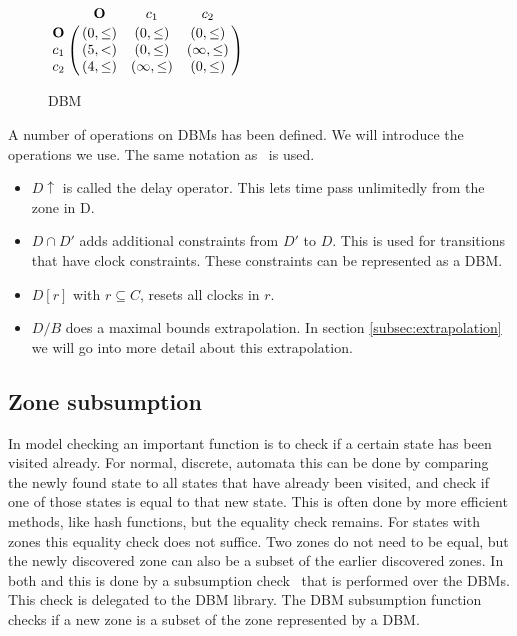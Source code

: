 \begin{figure}
	\centering
	\begin{math}
 \bordermatrix{ 		                 & \mathbf{O} & c_1           & c_2        \cr
 			\mathbf{O} &(0,\leq)      & (0,\leq)      & (0,\leq)     \cr
 			c_1        &(5,<   )      & (0,\leq)      & (\infty,\leq)\cr
 			c_2        &(4,\leq)      & (\infty,\leq) & (0,\leq)     \cr}
	\end{math}
	\caption{DBM}
	\label{fig:dbm}
\end{figure}

A number of operations on DBMs has been defined. We will introduce the operations we use. The same notation as~\cite{eemcs21972} is used.
\begin{itemize}
\item $D \uparrow$ is called the delay operator. This lets time pass unlimitedly from the zone in D.
\item $D \cap D'$ adds additional constraints from $D'$ to $D$. This is used for transitions that have clock constraints. These constraints can be represented as a DBM.
\item $D[r]$ with $r \subseteq C$, resets all clocks in $r$.
\item $D/B$ does a maximal bounds extrapolation. In section \ref{subsec:extrapolation} we will go into more detail about this extrapolation.

\end{itemize}

\subsection{Zone subsumption}
\label{subsec:subsumtion}
In model checking an important function is to check if a certain state has been visited already. For normal, discrete, automata this can be done by comparing the newly found state to all states that have already been visited, and check if one of those states is equal to that new state. This is often done by more efficient methods, like hash functions, but the equality check remains. For states with zones this equality check does not suffice. Two zones do not need to be equal, but the newly discovered zone can also be a subset of the earlier discovered zones. In both \ltsmin{} and \uppaal{} this is done by a subsumption check~\cite{eemcs21972,bbdlpw-ftrtft02} that is performed over the DBMs. This check is delegated to the \uppaal{} DBM library. The DBM subsumption function checks if a new zone is a subset of the zone represented by a DBM.

